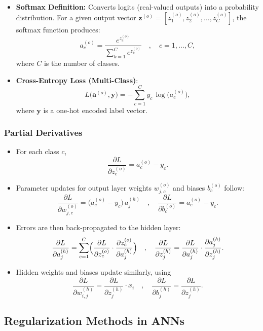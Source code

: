 \documentclass{article}
\begin{document}
\begin{itemize}
    \item \textbf{Softmax Definition:} Converts logits (real-valued outputs) into a probability distribution. For a given output vector $\mathbf{z}^{(o)} = [z_1^{(o)}, z_2^{(o)},\ldots, z_C^{(o)}]$, the softmax function produces:
    \[
    a_{c}^{(o)} 
    = \frac{e^{z_{c}^{(o)}}}{\sum_{k=1}^{C} e^{z_{k}^{(o)}}}
    \quad,\quad c = 1,\ldots, C,
    \]
    where $C$ is the number of classes.
    \item \textbf{Cross-Entropy Loss (Multi-Class)}:
    \[
    L\bigl(\mathbf{a}^{(o)}, \mathbf{y}\bigr)
    = -\sum_{c=1}^{C} y_c \,\log\bigl(a_{c}^{(o)}\bigr),
    \]
    where $\mathbf{y}$ is a one-hot encoded label vector.
\end{itemize}

\subsubsection{Partial Derivatives}

\begin{itemize}
    \item For each class $c$, 
    \[
    \frac{\partial L}{\partial z_{c}^{(o)}}
    = a_{c}^{(o)} - y_{c}.
    \]
    \item Parameter updates for output layer weights $w_{j,c}^{(o)}$ and biases $b_{c}^{(o)}$ follow:
    \[
    \frac{\partial L}{\partial w_{j,c}^{(o)}} 
    = \bigl(a_{c}^{(o)} - y_c\bigr)\, a_{j}^{(h)}
    \quad,\quad
    \frac{\partial L}{\partial b_{c}^{(o)}}
    = a_{c}^{(o)} - y_c.
    \]
    \item Errors are then back-propagated to the hidden layer:
    \[
    \frac{\partial L}{\partial a_{j}^{(h)}}
    = \sum_{c=1}^{C} \Bigl(\frac{\partial L}{\partial z_{c}^{(o)}} \cdot \frac{\partial z_{c}^{(o)}}{\partial a_{j}^{(h)}}\Bigr)
    \quad,\quad
    \frac{\partial L}{\partial z_{j}^{(h)}}
    = \frac{\partial L}{\partial a_{j}^{(h)}} \cdot \frac{\partial a_{j}^{(h)}}{\partial z_{j}^{(h)}}.
    \]
    \item Hidden weights and biases update similarly, using
    \[
    \frac{\partial L}{\partial w_{i,j}^{(h)}} 
    = \frac{\partial L}{\partial z_{j}^{(h)}} \cdot x_i
    \quad,\quad
    \frac{\partial L}{\partial b_{j}^{(h)}} 
    = \frac{\partial L}{\partial z_{j}^{(h)}}.
    \]
\end{itemize}

\subsection{Regularization Methods in ANNs}
\end{document}
